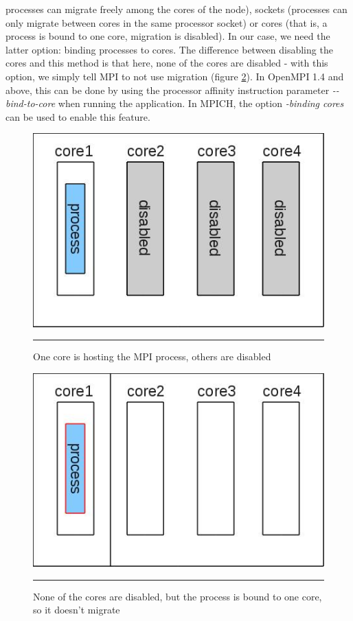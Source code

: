 processes can migrate freely among the cores of the node), sockets
(processes can only migrate between cores in the same processor
socket) or cores (that is, a process is bound to one core, migration
is disabled). In our case, we need the latter option: binding
processes to cores. The difference between disabling the cores and
this method is that here, none of the cores are disabled - with this
option, we simply tell MPI to not use migration (figure
\ref{fig:core_binding}). In OpenMPI 1.4 and above, this can be done by
using the processor affinity instruction parameter
\emph{-{}-bind-to-core} when running the application. In MPICH,
the option \emph{-binding cores} can be used to enable this feature.
\begin{figure}[htbp]
  \centering
    \includegraphics[scale=0.4]{./Figures/disabled_cores.jpg}
    \rule{35em}{0.5pt}
  \caption[Disabled cores]{One core is hosting the MPI process, others are disabled}
  \label{fig:disabled_cores}
\end{figure}
\begin{figure}[htbp]
  \centering
    \includegraphics[scale=0.4]{./Figures/bind_to_core.jpg}
    \rule{35em}{0.5pt}
  \caption[Core binding]{None of the cores are disabled, but the
    process is bound to one core, so it doesn't migrate}
  \label{fig:core_binding}
\end{figure}
